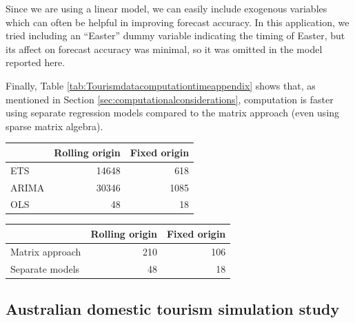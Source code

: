 \documentclass[11pt,a4paper,]{article}
\let\origtable\table
\let\endorigtable\endtable
\renewenvironment{table}[1][2] {
    \expandafter\origtable\expandafter[!htbp]
} {
    \endorigtable
}
\begin{document}
Since we are using a linear model, we can easily include exogenous variables which can often be helpful in improving forecast accuracy. In this application, we tried including an ``Easter'' dummy variable indicating the timing of Easter, but its affect on forecast accuracy was minimal, so it was omitted in the model reported here.

Finally, Table \ref{tab:Tourismdatacomputationtimeappendix} shows that, as mentioned in Section \ref{sec:computationalconsiderations}, computation is faster using separate regression models compared to the matrix approach (even using sparse matrix algebra).

\begin{table}

\caption{\label{tab:Tourismdatacomputationtime}Computation time (seconds) for ETS, ARIMA and OLS with reconciliation - Rolling and fixed origin forecasts on a 2 years test set - Tourism dataset}
\centering
\begin{tabular}[t]{lrr}
\toprule
 & Rolling origin & Fixed origin\\
\midrule
ETS & 14648 & 618\\
ARIMA & 30346 & 1085\\
OLS & 48 & 18\\
\bottomrule
\end{tabular}
\end{table}

\begin{table}

\caption{\label{tab:Tourismdatacomputationtimeappendix}Computation time (seconds) for OLS using the matrix approach and separate regression models, with reconciliation, on a rolling and fixed origin for 2 years test set.}
\centering
\begin{tabular}[t]{lrr}
\toprule
 & Rolling origin & Fixed origin\\
\midrule
Matrix approach & 210 & 106\\
Separate models & 48 & 18\\
\bottomrule
\end{tabular}
\end{table}

\hypertarget{australian-domestic-tourism-simulation-study}{%
\subsection{Australian domestic tourism simulation study}\label{australian-domestic-tourism-simulation-study}}
\end{document}
